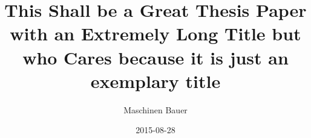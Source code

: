 \title{This Shall be a Great Thesis Paper with an Extremely Long Title but who Cares because it is just an exemplary title}
\author{Maschinen Bauer}
\date{2015-08-28}

\usepackage{lipsum}
